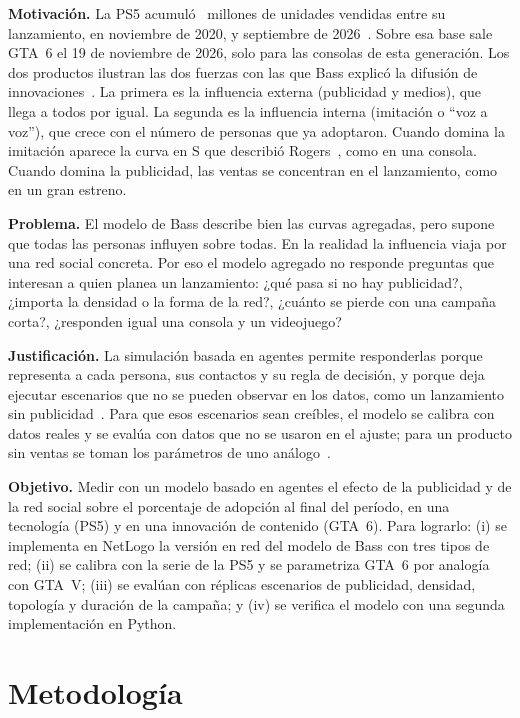 \documentclass{llncs}
\begin{document}
\textbf{Motivación.} La PS5 acumuló \cifraPsUnidadesFin\ millones de unidades vendidas entre su lanzamiento, en noviembre de 2020, y septiembre de 2026~\cite{sony2026}. Sobre esa base sale GTA~6 el 19 de noviembre de 2026, solo para las consolas de esta generación. Los dos productos ilustran las dos fuerzas con las que Bass explicó la difusión de innovaciones~\cite{bass1969}. La primera es la influencia externa (publicidad y medios), que llega a todos por igual. La segunda es la influencia interna (imitación o ``voz a voz''), que crece con el número de personas que ya adoptaron. Cuando domina la imitación aparece la curva en S que describió Rogers~\cite{rogers2003}, como en una consola. Cuando domina la publicidad, las ventas se concentran en el lanzamiento, como en un gran estreno.

\textbf{Problema.} El modelo de Bass describe bien las curvas agregadas, pero supone que todas las personas influyen sobre todas. En la realidad la influencia viaja por una red social concreta. Por eso el modelo agregado no responde preguntas que interesan a quien planea un lanzamiento: ¿qué pasa si no hay publicidad?, ¿importa la densidad o la forma de la red?, ¿cuánto se pierde con una campaña corta?, ¿responden igual una consola y un videojuego?

\textbf{Justificación.} La simulación basada en agentes permite responderlas porque representa a cada persona, sus contactos y su regla de decisión, y porque deja ejecutar escenarios que no se pueden observar en los datos, como un lanzamiento sin publicidad~\cite{goldenberg2001}. Para que esos escenarios sean creíbles, el modelo se calibra con datos reales y se evalúa con datos que no se usaron en el ajuste; para un producto sin ventas se toman los parámetros de uno análogo~\cite{thomas1985}.

\textbf{Objetivo.} Medir con un modelo basado en agentes el efecto de la publicidad y de la red social sobre el porcentaje de adopción al final del período, en una tecnología (PS5) y en una innovación de contenido (GTA~6). Para lograrlo: (i) se implementa en NetLogo la versión en red del modelo de Bass con tres tipos de red; (ii) se calibra con la serie de la PS5 y se parametriza GTA~6 por analogía con GTA~V; (iii) se evalúan con réplicas escenarios de publicidad, densidad, topología y duración de la campaña; y (iv) se verifica el modelo con una segunda implementación en Python.

\section{Metodología}
\label{sec:metodologia}
\end{document}
